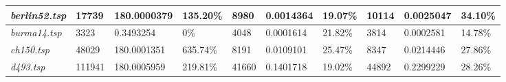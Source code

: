 \begin{landscape}
\begin{table}[]
\begin{tabular}{|l|l|l|l|l|l|l|l|l|l|}
  \textit{berlin52.tsp}                                   & 17739                                   & 180.0000379                                                                           & 135.20\%                                                                                & 8980                                    & 0.0014364                                                                              & 19.07\%                                                                                 & 10114                                   & 0.0025047                                                                             & 34.10\%                                                                                 \\ \hline
  \textit{burma14.tsp}                                    & 3323                                    & 0.3493254                                                                             & 0\%                                                                                     & 4048                                    & 0.0001614                                                                              & 21.82\%                                                                                 & 3814                                    & 0.0002581                                                                             & 14.78\%                                                                                 \\ \hline
  \textit{ch150.tsp}                                      & 48029                                   & 180.0001351                                                                           & 635.74\%                                                                                & 8191                                    & 0.0109101                                                                              & 25.47\%                                                                                 & 8347                                    & 0.0214446                                                                             & 27.86\%                                                                                 \\ \hline
  \textit{d493.tsp}                                       & 111941                                  & 180.0005959                                                                           & 219.81\%                                                                                & 41660                                   & 0.1401718                                                                              & 19.02\%                                                                                 & 44892                                   & 0.2299229                                                                             & 28.26\%                                                                                 \\ \hline

\end{tabular}
\end{table}
\end{landscape}
